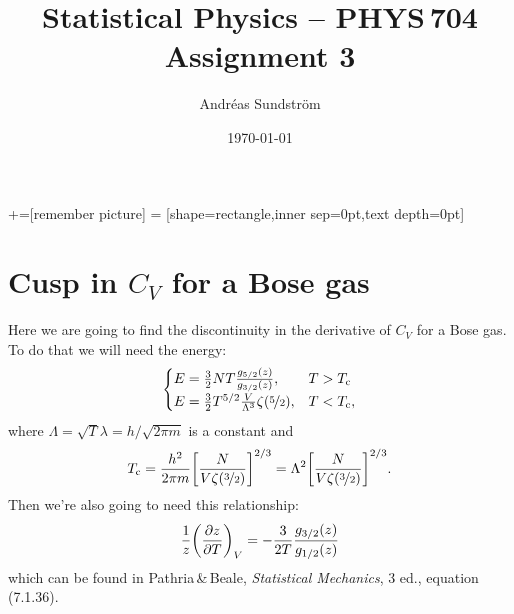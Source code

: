 \documentclass[11pt,letter, swedish, english
]{article}
\renewcommand{\thesubsection}{\arabic{section} (\alph{subsection})}
\begin{document}
+=[remember picture]
 = [shape=rectangle,inner sep=0pt,text depth=0pt]




\title{Statistical Physics -- PHYS\,704 \\
Assignment 3}
\author{Andréas Sundström}
\date{\today}

\maketitle


\newcommand{\Tc}{\ensuremath{T_{\text{c}}}}

\section{Cusp in $C_V$ for a Bose gas}
\renewcommand{\thesubsection}{\arabic{section} (\roman{subsection})}
Here we are going to find the discontinuity in the derivative of $C_V$
for a Bose gas. To do that we will need the energy:
\begin{equation}\label{eq:1_E}
\begin{cases}
E=\frac{3}{2}NT\frac{g_{5/2}(z)}{g_{3/2}(z)}, \quad& T>\Tc\\
E=\frac{3}{2}T^{5/2}\frac{V}{\Lambda^3}\zeta(\nicefrac{5}{2}), &T<\Tc,
\end{cases}
\end{equation}
where $\Lambda=\sqrt{T}\lambda=h/\sqrt{2\pi m}$ is a constant and
\begin{equation}
\Tc=\frac{h^2}{2\pi m}\qty[\frac{N}{V\zeta(\nicefrac{3}{2})}]^{2/3}
=\Lambda^2\qty[\frac{N}{V\zeta(\nicefrac{3}{2})}]^{2/3}.
\end{equation}
Then we're also going to need this relationship:
\begin{equation}\label{eq:1_dz}
\frac{1}{z}\qty(\pdv{z}{T})_V
=-\frac{3}{2T}\frac{g_{3/2}(z)}{g_{1/2}(z)}
\end{equation}
which can be found in Pathria\,\&\,Beale, \textit{Statistical
  Mechanics}, 3 ed., equation (7.1.36).
\end{document}
